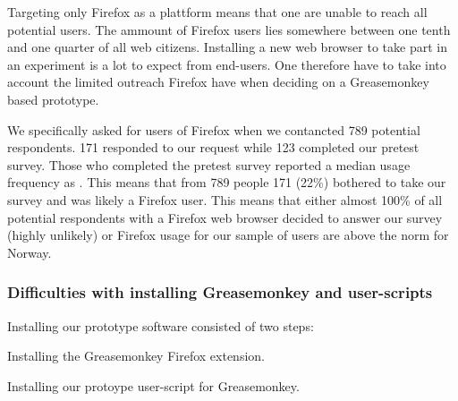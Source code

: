 Targeting only Firefox as a plattform means that one are unable to reach
all potential users. The ammount of Firefox users lies somewhere
between one tenth and one quarter of all web citizens.%
Installing a new web browser to take part in an
experiment is a lot to expect from end-users. One therefore have to take into
account the limited outreach Firefox have when deciding on a Greasemonkey
based prototype.

We specifically asked for users of Firefox when we contancted
789 potential respondents. 171 responded to our request while 123 completed
our pretest survey.%
Those who completed the pretest survey reported a median usage frequency as
.%
This means that from 789 people 171 (22\%) bothered to take our survey and was
likely a Firefox user.
This means that either almost 100\% of all potential respondents with a
Firefox web browser decided to answer our survey (highly unlikely) or Firefox
usage for our sample of \urort{} users are above the norm for Norway.

\subsubsection{Difficulties with installing Greasemonkey and user-scripts}

Installing our prototype software consisted of two steps:

\begin{enum}
  \item Installing the Greasemonkey Firefox extension.
  \item Installing our protoype user-script for Greasemonkey.
\end{enum}


